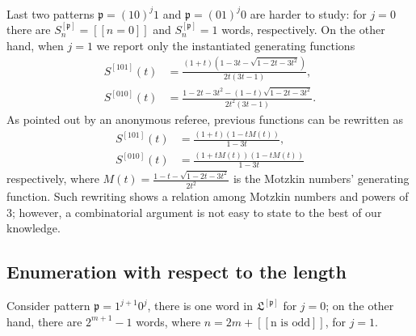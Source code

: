 Last two patterns $\mathfrak{p}=(10)^{j}1$ and $\mathfrak{p}=(01)^{j}0$ are
harder to study: for $j=0$ there are $S_{n}^{[\mathfrak{p}]}=[\![n=0]\!]$ and
$S_{n}^{[\mathfrak{p}]}=1$ words, respectively.  On the other hand, when $j=1$
we report only the instantiated generating functions
\begin{displaymath}
\begin{split}
    S^{[\mathfrak{101}]}(t) &=\frac{(1+t)\left(1-3t-\sqrt{1-2t-3t^{2}}\right)}{2t(3t-1)}, \\
    S^{[\mathfrak{010}]}(t) &=\frac{1-2t-3t^{2}-(1-t)\sqrt{1-2t-3t^{2}}}{2t^{2}(3t-1)}.
\end{split}
\end{displaymath}
As pointed out by an anonymous referee, previous functions can be rewritten as
\begin{displaymath}
\begin{split}
    S^{[\mathfrak{101}]}(t) &=\frac{(1+t)(1- t M(t))}{1-3t},\\
    S^{[\mathfrak{010}]}(t) &=\frac{(1+t M(t))(1-t M(t))}{1-3t}
\end{split}
\end{displaymath}
respectively, where $M(t)=\frac{1 - t - \sqrt{1-2t-3t^{2}} }{2t^{2}}$ is the
Motzkin numbers' generating function. Such rewriting shows a relation among Motzkin numbers
and powers of $3$; however, a combinatorial argument is not easy to state to
the best of our knowledge.

\subsection{Enumeration with respect to the length}

\begin{coro}
Consider pattern $\mathfrak{p}=1^{j+1}0^{j}$, there is one word in
$\mathfrak{L}^{[\mathfrak{p}]}$ for $j=0$; on the other hand, there are
$2^{m+1}-1$ words, where $n=2m +  [\![\text{n is odd}]\!]$,  for $j=1$.
\end{coro}

